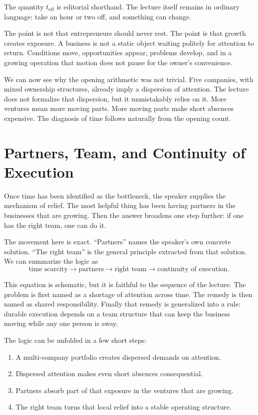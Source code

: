 \begin{remark}
The quantity \(t_{\mathrm{off}}\) is editorial shorthand. The lecture itself remains in ordinary language: take an hour or two off, and something can change.
\end{remark}

The point is not that entrepreneurs should never rest. The point is that growth creates exposure. A business is not a static object waiting politely for attention to return. Conditions move, opportunities appear, problems develop, and in a growing operation that motion does not pause for the owner's convenience.

We can now see why the opening arithmetic was not trivial. Five companies, with mixed ownership structures, already imply a dispersion of attention. The lecture does not formalize that dispersion, but it unmistakably relies on it. More ventures mean more moving parts. More moving parts make short absences expensive. The diagnosis of time follows naturally from the opening count.

\section{Partners, Team, and Continuity of Execution}

Once time has been identified as the bottleneck, the speaker supplies the mechanism of relief. The most helpful thing has been having partners in the businesses that are growing. Then the answer broadens one step further: if one has the right team, one can do it.

The movement here is exact. ``Partners'' names the speaker's own concrete solution. ``The right team'' is the general principle extracted from that solution. We can summarize the logic as
\begin{equation}
\text{time scarcity}
\to
\text{partners}
\to
\text{right team}
\to
\text{continuity of execution}.
\end{equation}

This equation is schematic, but it is faithful to the sequence of the lecture. The problem is first named as a shortage of attention across time. The remedy is then named as shared responsibility. Finally that remedy is generalized into a rule: durable execution depends on a team structure that can keep the business moving while any one person is away.

The logic can be unfolded in a few short steps:
\begin{enumerate}
\item A multi-company portfolio creates dispersed demands on attention.
\item Dispersed attention makes even short absences consequential.
\item Partners absorb part of that exposure in the ventures that are growing.
\item The right team turns that local relief into a stable operating structure.
\end{enumerate}

